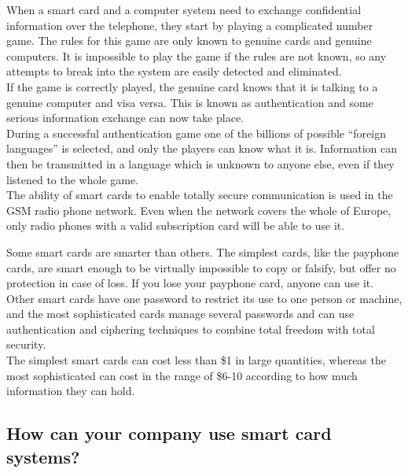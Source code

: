 \begin{htmllist}
    When a smart card and a computer system need to exchange confidential
    information over the telephone, they start by playing a complicated
    number game. The rules for this game are only known to genuine cards
    and genuine computers. It is impossible to play the game if the rules
    are not known, so any attempts to break into the system are easily
    detected and eliminated.\\
    
    If the game is correctly played, the genuine card knows that it is
    talking to a genuine computer and visa versa. This is known as
    authentication and some serious information exchange can now take place.\\
    
    During a successful authentication game one of the billions of possible
    ``foreign languages'' is selected, and only the players can know what
    it is. Information can then be transmitted in a language which is
    unknown to anyone else, even if they listened to the whole game.\\
    
    The ability of smart cards to enable totally secure communication is
    used in the GSM radio phone network. Even when the network covers the
    whole of Europe, only radio phones with a valid subscription card will
    be able to use it.\\

    
    Some smart cards are smarter than others. The simplest cards, like the
    payphone cards, are smart enough to be virtually impossible to copy or
    falsify, but offer no protection in case of loss. If you lose your
    payphone card, anyone can use it. Other smart cards have one password
    to restrict its use to one person or machine, and the most
    sophisticated cards manage several passwords and can use authentication
    and ciphering techniques to combine total freedom with total security.\\
    
    The simplest smart cards can cost less than \$1 in large quantities,
    whereas the most sophisticated can cost in the range of \$6-10
    according to how much information they can hold.
\end{htmllist}

\subsection{How can your company use smart card systems?}

